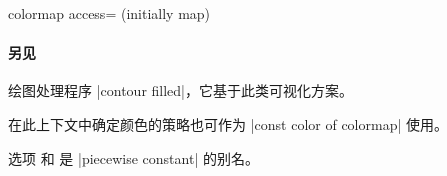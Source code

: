 \begin{pgfplotskey}{colormap access= (initially map)%
}
    \paragraph{另见}

    绘图处理程序 |contour filled|，它基于此类可视化方案。

    在此上下文中确定颜色的策略也可作为
    |const color of colormap| 使用。

    选项  和  是
    |piecewise constant| 的别名。
\end{pgfplotskey}
